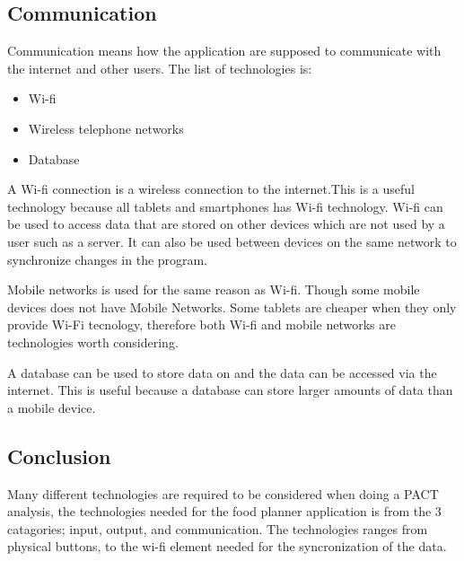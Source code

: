\subsection{Communication}

Communication means how the application are supposed to communicate with the internet and other users. The list of technologies is:

\begin{itemize}
	\item Wi-fi
	\item Wireless telephone networks    
    \item Database
\end{itemize}

A Wi-fi connection is a wireless connection to the internet.This is a useful technology because all tablets and smartphones has Wi-fi technology. Wi-fi can be used to access data that are stored on other devices which are not used by a user such as a server. It can also be used between devices on the same network to synchronize changes in the program.    

Mobile networks is used for the same reason as Wi-fi. Though some mobile devices does not have Mobile Networks. Some tablets are cheaper when they only provide Wi-Fi tecnology, therefore both Wi-fi and mobile networks are technologies worth considering.

A database can be used to store data on and the data can be accessed via the internet. This is useful because a database can store larger amounts of data than a mobile device. 
 
\subsection{Conclusion}

Many different technologies are required to be considered when doing a PACT analysis, the technologies needed for the food planner application is from the 3 catagories; input, output, and communication. The technologies ranges from physical buttons, to the wi-fi element needed for the syncronization of the data.
